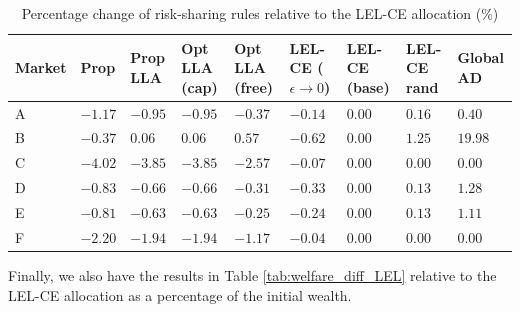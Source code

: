\begin{table}[htbp]
  \centering
  \small
  \caption{Percentage change of risk-sharing rules relative to the LEL-CE allocation (\%)}
  \label{tab:LEL_Results_Pct}
  \vspace{0.5em}
  \setlength{\tabcolsep}{3pt} %
  \begin{tabularx}{\textwidth}{l *{8}{Y}}
    \toprule
    \textbf{Market} & 
    \textbf{Prop} & 
    \textbf{Prop} \newline \textbf{LLA} & 
    \textbf{Opt LLA} \newline \textbf{(cap)} & 
    \textbf{Opt LLA} \newline \textbf{(free)} & 
    \textbf{LEL-CE} \newline \textbf{($\epsilon \to 0$)} & 
    \textbf{LEL-CE} \newline \textbf{(base)} & 
    \textbf{LEL-CE} \newline \textbf{rand} & 
    \textbf{Global} \newline \textbf{AD} \\
    \midrule
    A & $-1.17$ & $-0.95$ & $-0.95$ & $-0.37$ & $-0.14$ & $0.00$ & $0.16$  & $0.40$  \\
    B & $-0.37$ &  $0.06$ &  $0.06$ &  $0.57$ & $-0.62$ & $0.00$ & $1.25$  & $19.98$ \\
    C & $-4.02$ & $-3.85$ & $-3.85$ & $-2.57$ & $-0.07$ & $0.00$ & $0.00$  & $0.00$  \\
    D & $-0.83$ & $-0.66$ & $-0.66$ & $-0.31$ & $-0.33$ & $0.00$ & $0.13$  & $1.28$  \\
    E & $-0.81$ & $-0.63$ & $-0.63$ & $-0.25$ & $-0.24$ & $0.00$ & $0.13$  & $1.11$  \\
    F & $-2.20$ & $-1.94$ & $-1.94$ & $-1.17$ & $-0.04$ & $0.00$ & $0.00$  & $0.00$  \\
    \bottomrule
  \end{tabularx}
\end{table}
Finally, we also have the results in Table \ref{tab:welfare_diff_LEL} relative to the LEL-CE allocation as a percentage of the initial wealth.
